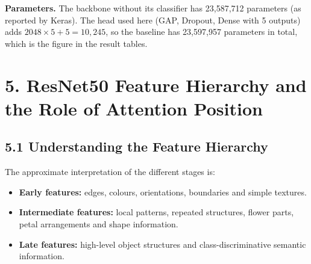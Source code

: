 \documentclass[11pt]{article}
\begin{document}
\begin{center}
\end{center}

\textbf{Parameters.} The backbone without its classifier has 23{,}587{,}712
parameters (as reported by Keras). The head used here (GAP, Dropout, Dense
with 5 outputs) adds $2048\times5+5=10{,}245$, so the baseline has
23{,}597{,}957 parameters in total, which is the figure in the result tables.

\section*{5. ResNet50 Feature Hierarchy and the Role of Attention Position}

\subsection*{5.1 Understanding the Feature Hierarchy}

The approximate interpretation of the different stages is:

\begin{itemize}
\item \textbf{Early features:} edges, colours, orientations, boundaries and
simple textures.
\item \textbf{Intermediate features:} local patterns, repeated structures,
flower parts, petal arrangements and shape information.
\item \textbf{Late features:} high-level object structures and
class-discriminative semantic information.
\end{itemize}
\end{document}
